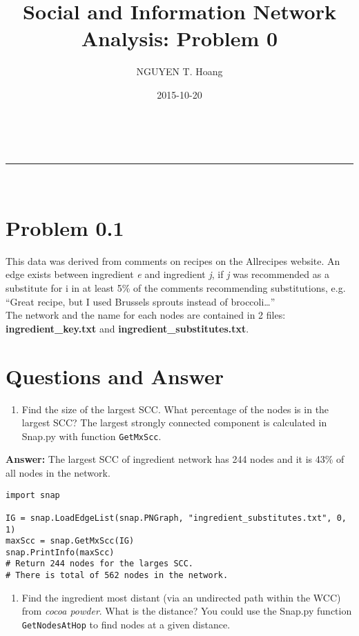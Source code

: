 \documentclass[a4paper,12pt]{article}
\makeatletter
\newcommand{\linia}{\rule{\linewidth}{0.5pt}}
\renewcommand{\maketitle}{
\begin{center}
\vspace{2ex}
{\huge \textsc{\@title}}
\vspace{1ex}
\\
\linia\\
\@author \hfill \@date
\vspace{4ex}
\end{center}
}
\makeatother
\begin{document}
\title{Social and Information Network Analysis: Problem 0}

\author{NGUYEN T. Hoang}

\date{2015-10-20} 

\maketitle


\section*{Problem 0.1}

This data was derived from comments on recipes on the Allrecipes website. An edge exists between ingredient \emph{e} and ingredient \emph{j}, if \emph{j} was recommended as a substitute for i in at least 5\% of the comments recommending substitutions, e.g. ``Great recipe, but I used Brussels sprouts instead of broccoli\ldots''\\

\noindent
The network and the name for each nodes are contained in 2 files: \textbf{ingredient\_key.txt} and \textbf{ingredient\_substitutes.txt}. \\ 

\section*{Questions and Answer}
\begin{enumerate}
    \item Find the size of the largest SCC. What percentage of the nodes is in the largest SCC? The largest strongly connected component is calculated in Snap.py with function \texttt{GetMxScc}.
\end{enumerate}

\noindent
\textbf{Answer:} The largest SCC of ingredient network has 244 nodes and it is 43\% of all nodes in the network.

\begin{lstlisting}[label={list:first},caption=Load the network from file name and return the size of the largest SCC]
import snap

IG = snap.LoadEdgeList(snap.PNGraph, "ingredient_substitutes.txt", 0, 1)
maxScc = snap.GetMxScc(IG)
snap.PrintInfo(maxScc)
# Return 244 nodes for the larges SCC.
# There is total of 562 nodes in the network.
\end{lstlisting}

\begin{enumerate}
    \item Find the ingredient most distant (via an undirected path within the WCC) from \emph{cocoa powder}. What is the distance? You could use the Snap.py function \texttt{GetNodesAtHop} to find nodes at a given distance.
\end{enumerate}
\end{document}
